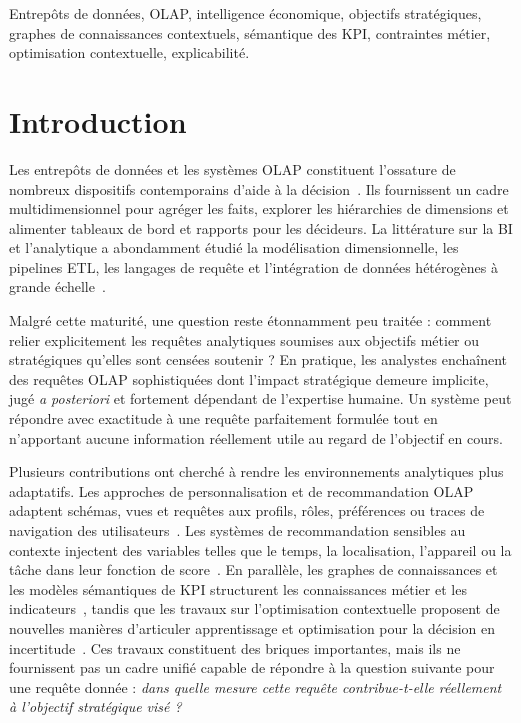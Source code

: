 \documentclass[journal]{IEEEtran}
\begin{document}
\begin{IEEEkeywords}
Entrepôts de données, OLAP, intelligence économique, objectifs stratégiques, graphes de connaissances contextuels, sémantique des KPI, contraintes métier, optimisation contextuelle, explicabilité.
\end{IEEEkeywords}

\section{Introduction}
\label{sec:intro}

Les entrepôts de données et les systèmes OLAP constituent l'ossature de nombreux dispositifs contemporains d'aide à la décision~\cite{ChaudhuriDayal97,KimballRoss2013,ChenBI2012}. Ils fournissent un cadre multidimensionnel pour agréger les faits, explorer les hiérarchies de dimensions et alimenter tableaux de bord et rapports pour les décideurs. La littérature sur la BI et l'analytique a abondamment étudié la modélisation dimensionnelle, les pipelines ETL, les langages de requête et l'intégration de données hétérogènes à grande échelle~\cite{ChaudhuriDayal97,KimballRoss2013,ChenBI2012}.

Malgré cette maturité, une question reste étonnamment peu traitée : comment relier explicitement les requêtes analytiques soumises aux objectifs métier ou stratégiques qu'elles sont censées soutenir ? En pratique, les analystes enchaînent des requêtes OLAP sophistiquées dont l'impact stratégique demeure implicite, jugé \emph{a posteriori} et fortement dépendant de l'expertise humaine. Un système peut répondre avec exactitude à une requête parfaitement formulée tout en n'apportant aucune information réellement utile au regard de l'objectif en cours.

Plusieurs contributions ont cherché à rendre les environnements analytiques plus adaptatifs. Les approches de personnalisation et de recommandation OLAP adaptent schémas, vues et requêtes aux profils, rôles, préférences ou traces de navigation des utilisateurs~\cite{AissiGouider2012,GarrigosER2009,AligonDSS2015}. Les systèmes de recommandation sensibles au contexte injectent des variables telles que le temps, la localisation, l'appareil ou la tâche dans leur fonction de score~\cite{RoyContextOLAP2022,AdomaviciusTuzhilin2011}. En parallèle, les graphes de connaissances et les modèles sémantiques de KPI structurent les connaissances métier et les indicateurs~\cite{HoganKGSurvey2021,DiamantiniKPISurvey2025,Niedritis2011,RomeroAbello2010}, tandis que les travaux sur l'optimisation contextuelle proposent de nouvelles manières d'articuler apprentissage et optimisation pour la décision en incertitude~\cite{SadanaEJOR2025}. Ces travaux constituent des briques importantes, mais ils ne fournissent pas un cadre unifié capable de répondre à la question suivante pour une requête donnée : \emph{dans quelle mesure cette requête contribue-t-elle réellement à l'objectif stratégique visé ?}
\end{document}
